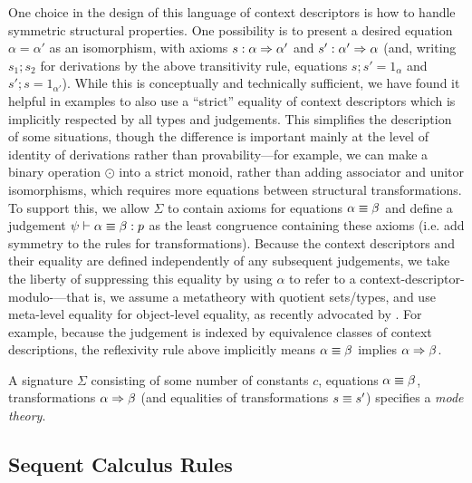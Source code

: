 One choice in the design of this language of context descriptors is how
to handle symmetric structural properties.  One possibility is to
present a desired equation $\alpha = \alpha'$ as an isomorphism, with
axioms $s : \alpha \Rightarrow \alpha'$ and $s' : \alpha' \Rightarrow \alpha$ (and,
writing $s_1;s_2$ for derivations by the above transitivity rule,
equations $s;s' = 1_{\alpha}$ and $s';s = 1_{\alpha'}$).  While this is
conceptually and technically sufficient, we have found it helpful in
examples to also use a ``strict'' equality of context descriptors which
is implicitly respected by all types and judgements.  This simplifies
the description of some situations, though the difference is important
mainly at the level of identity of derivations rather than
provability---for example, we can make a binary operation $\odot$ into a
strict monoid, rather than adding associator and unitor isomorphisms,
which requires more equations between structural transformations.  To
support this, we allow $\Sigma$ to contain axioms for equations $\alpha
\equiv \beta$ and define a judgement $\psi \vdash \alpha \equiv \beta : p$
as the least congruence containing these axioms (i.e. add symmetry to
the rules for transformations).  Because the context descriptors and
their equality are defined independently of any subsequent judgements,
we take the liberty of suppressing this equality by using $\alpha$ to
refer to a context-descriptor-modulo-\deq---that is, we assume a
metatheory with quotient sets/types, and use meta-level equality for
object-level equality, as recently advocated by
\citet{altenkirchkaposi16qit}.  For example, because the judgement
 is indexed by equivalence classes of
context descriptions, the reflexivity rule above implicitly means
$\alpha \equiv \beta$ implies $\alpha \Rightarrow \beta$.

A signature $\Sigma$ consisting of some number of constants $c$,
equations $\alpha \equiv \beta$, transformations $\alpha \Rightarrow \beta$ (and
equalities of transformations $s \equiv s'$) specifies a \emph{mode theory}.

\subsection{Sequent Calculus Rules}

